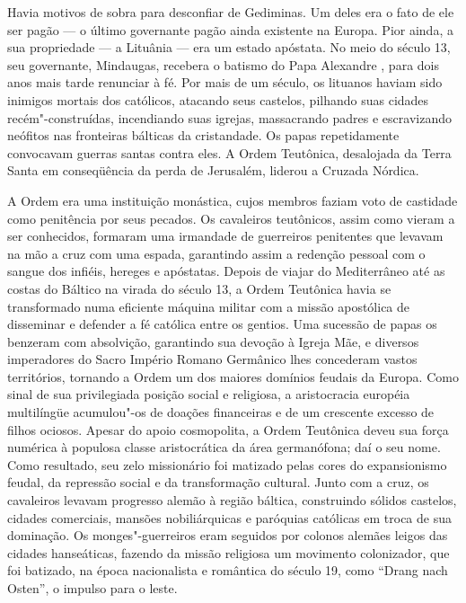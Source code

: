 Havia motivos de sobra para desconfiar de Gediminas. Um deles era o fato
de ele ser pagão --- o último governante pagão ainda existente na Europa.
Pior ainda, a sua propriedade --- a Lituânia --- era um estado apóstata. No
meio do século 13, seu governante, Mindaugas, recebera o batismo do Papa
Alexandre , para dois anos mais tarde renunciar à fé. Por mais de um
século, os lituanos haviam sido inimigos mortais dos católicos, atacando
seus castelos, pilhando suas cidades recém"-construídas, incendiando suas
igrejas, massacrando padres e escravizando neófitos nas fronteiras
bálticas da cristandade. Os papas repetidamente convocavam guerras
santas contra eles. A Ordem Teutônica, desalojada da Terra Santa em
conseqüência da perda de Jerusalém, liderou a Cruzada Nórdica.

A Ordem era uma instituição monástica, cujos membros faziam voto de
castidade como penitência por seus pecados. Os cavaleiros teutônicos,
assim como vieram a ser conhecidos, formaram uma irmandade de guerreiros
penitentes que levavam na mão a cruz com uma espada, garantindo assim a
redenção pessoal com o sangue dos infiéis, hereges e apóstatas. Depois
de viajar do Mediterrâneo até as costas do Báltico na virada do século
13, a Ordem Teutônica havia se transformado numa eficiente máquina
militar com a missão apostólica de disseminar e defender a fé católica
entre os gentios. Uma sucessão de papas os benzeram com absolvição,
garantindo sua devoção à Igreja Mãe, e diversos imperadores do Sacro
Império Romano Germânico lhes concederam vastos territórios, tornando a
Ordem um dos maiores domínios feudais da Europa. Como sinal de sua
privilegiada posição social e religiosa, a aristocracia européia
multilíngüe acumulou"-os de doações financeiras e de um crescente excesso
de filhos ociosos. Apesar do apoio cosmopolita, a Ordem Teutônica deveu
sua força numérica à populosa classe aristocrática da área germanófona;
daí o seu nome. Como resultado, seu zelo missionário foi matizado pelas
cores do expansionismo feudal, da repressão social e da transformação
cultural. Junto com a cruz, os cavaleiros levavam progresso alemão à
região báltica, construindo sólidos castelos, cidades comerciais,
mansões nobiliárquicas e paróquias católicas em troca de sua dominação.
Os monges"-guerreiros eram seguidos por colonos alemães leigos das
cidades hanseáticas, fazendo da missão religiosa um movimento
colonizador, que foi batizado, na época nacionalista e romântica do
século 19, como ``Drang nach Osten'', o impulso para o leste.

